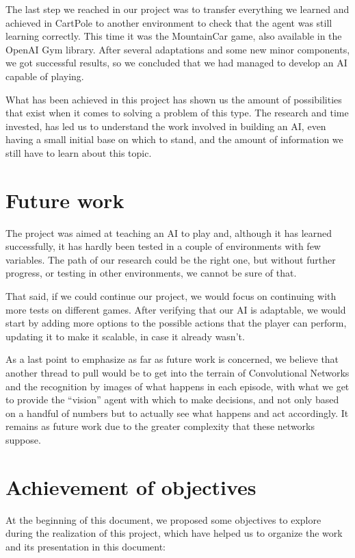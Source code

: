 The last step we reached in our project was to transfer everything we learned and achieved in CartPole to another environment to check that the agent was still learning correctly. This time it was the MountainCar game, also available in the OpenAI Gym library. After several adaptations and some new minor components, we got successful results, so we concluded that we had managed to develop an AI capable of playing.

What has been achieved in this project has shown us the amount of possibilities that exist when it comes to solving a problem of this type. The research and time invested, has led us to understand the work involved in building an AI, even having a small initial base on which to stand, and the amount of information we still have to learn about this topic.

\section{Future work}

The project was aimed at teaching an AI to play and, although it has learned successfully, it has hardly been tested in a couple of environments with few variables. The path of our research could be the right one, but without further progress, or testing in other environments, we cannot be sure of that.

That said, if we could continue our project, we would focus on continuing with more tests on different games. After verifying that our AI is adaptable, we would start by adding more options to the possible actions that the player can perform, updating it to make it scalable, in case it already wasn't.

As a last point to emphasize as far as future work is concerned, we believe that another thread to pull would be to get into the terrain of Convolutional Networks and the recognition by images of what happens in each episode, with what we get to provide the ``vision'' agent with which to make decisions, and not only based on a handful of numbers but to actually see what happens and act accordingly. It remains as future work due to the greater complexity that these networks suppose.

\section{Achievement of objectives}

At the beginning of this document, we proposed some objectives to explore during the realization of this project, which have helped us to organize the work and its presentation in this document:

